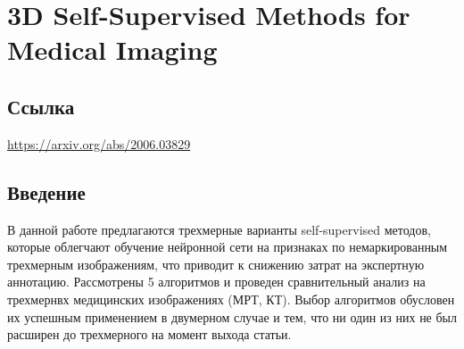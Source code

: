 \section{3D Self-Supervised Methods for Medical Imaging}

\subsection*{Ссылка} \url{https://arxiv.org/abs/2006.03829}
\subsection*{Введение}
В данной работе предлагаются трехмерные варианты self-supervised 
методов, которые облегчают обучение нейронной сети на признаках 
по немаркированным трехмерным изображениям, что приводит к снижению
затрат на экспертную аннотацию. Рассмотрены 5 алгоритмов и проведен 
сравнительный анализ на трехмернвх медицинских изображениях (МРТ, КТ).
Выбор алгоритмов обусловен их успешным применением в двумерном случае и тем,
что ни один из них не был расширен до трехмерного на момент выхода статьи.

